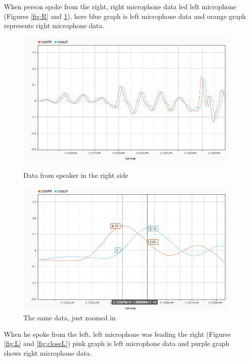 When person spoke from the right, right microphone data led left microphone (Figures  
\ref{fig:R} and \ref{fig:closeR}), here blue graph is left microphone data and orange graph represents right microphone data.\\
\begin{figure}[htp]
\centering
\begin{minipage}{.55\textwidth}
  \centering
  \includegraphics[width=1\linewidth]{Illustrations/DataR.png}
  \caption{Data from speaker in the right side}
  \label{fig:R}
\end{minipage}%
\begin{minipage}{.55\textwidth}
  \centering
  \includegraphics[width=1\linewidth]{Illustrations/DataR_with_Markers.png}
  \caption{The same data, just zoomed in}
  \label{fig:closeR}
\end{minipage}
\end{figure}

When he spoke from the left, left microphone was leading the right (Figures  \ref{fig:L} and \ref{fig:closeL}) pink graph is left microphone data and purple graph shows right microphone data.
 
